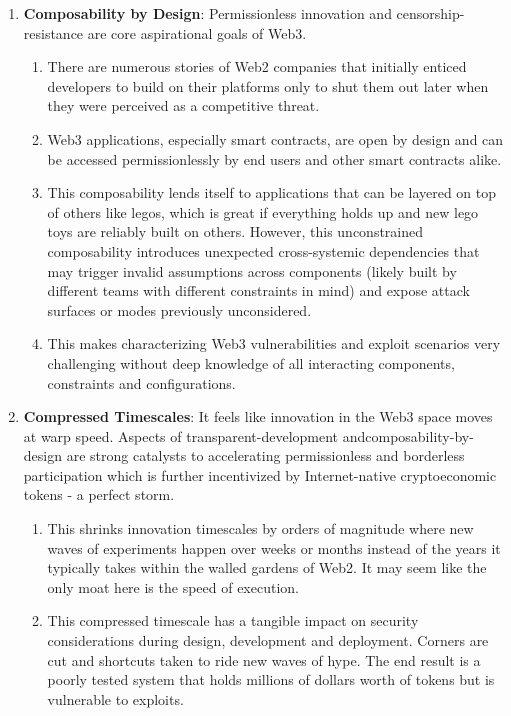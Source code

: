 \begin{enumerate}
\item\textbf{Composability by Design}: Permissionless innovation and censorship-resistance are core aspirational goals of Web3.
\begin{enumerate}
\item There are numerous stories of Web2 companies that initially enticed developers to build on their platforms only to shut them out later when they were perceived as a competitive threat.
\item Web3 applications, especially smart contracts, are open by design and can be accessed permissionlessly by end users and other smart contracts alike.
\item This composability lends itself to applications that can be layered on top of others like legos, which is great if everything holds up and new lego toys are reliably built on others. However, this unconstrained composability introduces unexpected cross-systemic dependencies that may trigger invalid assumptions across components (likely built by different teams with different constraints in mind) and expose attack surfaces or modes previously unconsidered.
\item This makes characterizing Web3 vulnerabilities and exploit scenarios very challenging without deep knowledge of all interacting components, constraints and configurations.
\end{enumerate}

\item\textbf{Compressed Timescales}: It feels like innovation in the Web3 space moves at warp speed. Aspects of transparent-development and\linebreak composability-by-design are strong catalysts to accelerating permissionless and borderless participation which is further incentivized by Internet-native cryptoeconomic tokens - a perfect storm.
\begin{enumerate}
\item This shrinks innovation timescales by orders of magnitude where new waves of experiments happen over weeks or months instead of the years it typically takes within the walled gardens of Web2. It may seem like the only moat here is the speed of execution.
\item This compressed timescale has a tangible impact on security considerations during design, development and deployment. Corners are cut and shortcuts taken to ride new waves of hype. The end result is a poorly tested system that holds millions of dollars worth of tokens but is vulnerable to exploits.
\end{enumerate}


\end{enumerate}
